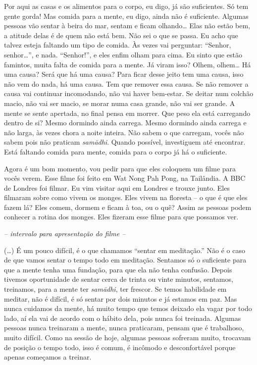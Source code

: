 Por aqui as casas e os alimentos para o corpo, eu digo, já são
suficientes. Só tem gente gorda! Mas comida para a mente, eu digo,
ainda não é suficiente. Algumas pessoas vão sentar à beira do mar,
sentam e ficam olhando… Elas não estão bem, a atitude delas é de quem
não está bem. Não sei o que se passa. Eu acho que talvez esteja
faltando um tipo de comida. Às vezes vai perguntar: “Senhor, senhor…”,
e nada. “Senhor!”, e eles enfim olham para cima. Eu sinto que estão
famintos, muita falta de comida para a mente. Já viram isso? Olhem,
olhem… Há uma causa? Será que há uma causa? Para ficar desse jeito tem
uma causa, isso não vem do nada, há uma causa. Tem que remover essa
causa. Se não remover a causa vai continuar incomodando, não vai haver
bem-estar. Se deitar num colchão macio, não vai ser macio, se morar
numa casa grande, não vai ser grande. A mente se sente apertada, no
final pensa em morrer. Que peso ela está carregando dentro de si? Mesmo
dormindo ainda carrega. Mesmo dormindo ainda carrega e não larga, às
vezes chora a noite inteira. Não sabem o que carregam, vocês não sabem
pois não praticam \textit{samādhi}. Quando possível, investiguem até
encontrar. Está faltando comida para mente, comida para o corpo já há o
suficiente.

Agora é um bom momento, vou pedir para que eles coloquem um filme
para vocês verem. Esse filme foi feito em Wat Nong Pah Pong, na
Tailândia. A BBC de Londres foi filmar. Eu vim visitar aqui em Londres
e trouxe junto. Eles filmaram sobre como vivem os monges. Eles vivem na
floresta – o que é que eles fazem lá? Eles comem, dormem e ficam à toa,
ou o quê? Assim as pessoas podem conhecer a rotina dos monges. Eles
fizeram esse filme para que possamos ver. 

{\itshape -- intervalo para apresentação do filme --}

(…) É um pouco difícil, é o que chamamos “sentar em meditação.” Não
é o caso de que vamos sentar o tempo todo em meditação. Sentamos só o
suficiente para que a mente tenha uma fundação, para que ela não tenha
confusão. Depois tivemos oportunidade de sentar cerca de trinta ou
vinte minutos, sentamos, treinamos, para a mente ter
\textit{samādhi}, ter frescor. Se temos habilidade em meditar, não é
difícil, é só sentar por dois minutos e já estamos em paz. Mas nunca
cuidamos da mente, há muito tempo que temos deixado ela vagar por todo
lado, aí ela vai de acordo com o hábito dela, pois nunca foi treinada.
Algumas pessoas nunca treinaram a mente, nunca praticaram, pensam que é
trabalhoso, muito difícil. Como na sessão de hoje, algumas pessoas
sofreram muito, trocavam de posição o tempo todo, isso é comum, é
incômodo e desconfortável porque apenas começamos a treinar.

